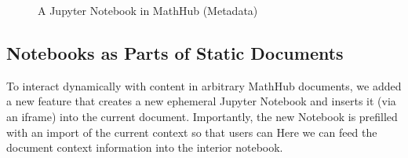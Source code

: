 \begin{figure}[ht]\centering
  \caption{A Jupyter Notebook in MathHub (Metadata)}\label{fig:mathhub-NB}
\end{figure}


\subsection{Notebooks as Parts of Static Documents}

To interact dynamically with content in arbitrary MathHub documents, we added a new feature that creates a new ephemeral Jupyter Notebook and inserts it (via an iframe) into the current document.
Importantly, the new Notebook is prefilled with an import of the current context so that users can Here we can feed the document context information into the interior notebook.

